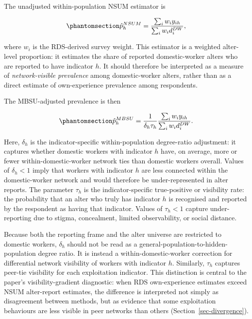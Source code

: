 \documentclass[
  12pt,
  letterpaper,
  DIV=11,
  numbers=noendperiod]{scrartcl}
\begin{document}
The unadjusted within-population NSUM estimator is

\begin{equation}\phantomsection\label{eq-1}{
\hat p_h^{NSUM} = \frac{\sum_i w_i y_{ih}}{\sum_i w_i d_i^{DW}},
}\end{equation}

where \(w_i\) is the RDS-derived survey weight. This estimator is a
weighted alter-level proportion: it estimates the share of reported
domestic-worker alters who are reported to have indicator \(h\). It
should therefore be interpreted as a measure of \emph{network-visible
prevalence} among domestic-worker alters, rather than as a direct
estimate of own-experience prevalence among respondents.

The MBSU-adjusted prevalence is then

\begin{equation}\phantomsection\label{eq-2}{
\hat p_h^{MBSU} =
\frac{1}{\delta_h \tau_h}
\frac{\sum_i w_i y_{ih}}{\sum_i w_i d_i^{DW}}.
}\end{equation}

Here, \(\delta_h\) is the indicator-specific within-population
degree-ratio adjustment: it captures whether domestic workers with
indicator \(h\) have, on average, more or fewer within-domestic-worker
network ties than domestic workers overall. Values of \(\delta_h < 1\)
imply that workers with indicator \(h\) are less connected within the
domestic-worker network and would therefore be under-represented in
alter reports. The parameter \(\tau_h\) is the indicator-specific
true-positive or visibility rate: the probability that an alter who
truly has indicator \(h\) is recognised and reported by the respondent
as having that indicator. Values of \(\tau_h < 1\) capture
under-reporting due to stigma, concealment, limited observability, or
social distance.

Because both the reporting frame and the alter universe are restricted
to domestic workers, \(\delta_h\) should not be read as a
general-population-to-hidden-population degree ratio. It is instead a
within-domestic-worker correction for differential network visibility of
workers with indicator \(h\). Similarly, \(\tau_h\) captures peer-tie
visibility for each exploitation indicator. This distinction is central
to the paper's visibility-gradient diagnostic: when RDS own-experience
estimates exceed NSUM alter-report estimates, the difference is
interpreted not simply as disagreement between methods, but as evidence
that some exploitation behaviours are less visible in peer networks than
others (Section~\ref{sec-divergence}).
\end{document}

